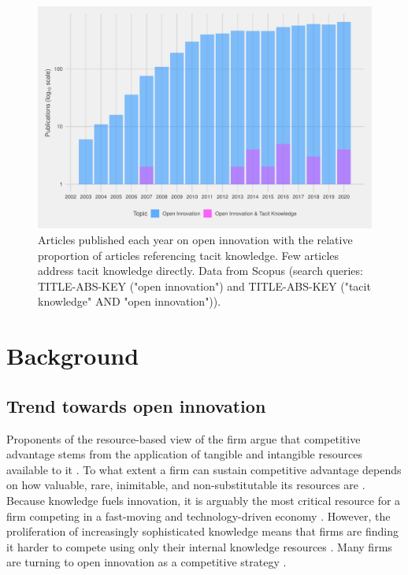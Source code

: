 \begin{figure}[p]
\centering
\includegraphics[width=0.9\linewidth]{Images/tk_oi.pdf}
\caption[Articles published each year on open innovation]{Articles published each year on open innovation with the relative proportion of articles referencing tacit knowledge. Few articles address tacit knowledge directly. Data from Scopus (search queries: TITLE-ABS-KEY ("open innovation") and TITLE-ABS-KEY ("tacit knowledge"  AND  "open innovation")).}
\label{fig:biblio}
\end{figure}

\section{Background}

\subsection{Trend towards open innovation} \label{sss:oi}

Proponents of the resource-based view of the firm argue that competitive advantage stems from the application of tangible and intangible resources available to it \citep{wernerfelt1984resource,peteraf1993cornerstones}. To what extent a firm can sustain competitive advantage depends on how valuable, rare, inimitable, and non-substitutable its resources are \citep{barney1991firm}. Because knowledge fuels innovation, it is arguably the most critical resource for a firm competing in a fast-moving and technology-driven economy \citep{grant1996toward,urbancova2013competitive}. However, the proliferation of increasingly sophisticated knowledge means that firms are finding it harder to compete using only their internal knowledge resources \citep{chesbrough2009open,enkel2009open}. Many firms are turning to open innovation as a competitive strategy \citep{chesbrough2003open,enkel2009open,stanko2017under}. \medskip

